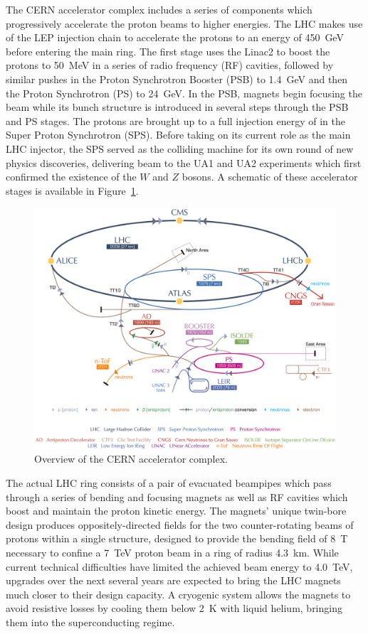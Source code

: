 The CERN accelerator complex includes a series of components which progressively accelerate the proton beams to higher energies.
The LHC makes use of the LEP injection chain to accelerate the protons to an energy of \SI{450}{\GeV} before entering the main ring.  
The first stage uses the Linac2 to boost the protons to \SI{50}{\MeV} in a series of radio frequency (RF) cavities, followed by similar pushes in the Proton Synchrotron Booster (PSB) to \SI{1.4}{\GeV} and then the Proton Synchrotron (PS) to \SI{24}{\GeV}.  In the PSB, magnets begin focusing the beam while its bunch structure is introduced in several steps through the PSB and PS stages.  The protons are brought up to a full injection energy of  in the Super Proton Synchrotron (SPS).  Before taking on its current role as the main LHC injector, the SPS served as the colliding machine for its own round of new physics discoveries, delivering beam to the UA1 and UA2 experiments which first confirmed the existence of the $W$ and $Z$ bosons.  A schematic of these accelerator stages is available in Figure~\ref{fig:lhc-complex}.

\begin{figure}
  \centering
  \includegraphics[width=\textwidth]{figures/cern-accelerator-complex-detail.png}
  \caption{Overview of the CERN accelerator complex.}
  \label{fig:lhc-complex}
\end{figure}

The actual LHC ring consists of a pair of evacuated beampipes which pass through a series of bending and focusing magnets as well as RF cavities which boost and maintain the proton kinetic energy.  The magnets' unique twin-bore design produces oppositely-directed fields for the two counter-rotating beams of protons within a single structure, designed to provide the bending field of \SI{8}{T} necessary to confine a \SI{7}{TeV} proton beam in a ring of radius \SI{4.3}{km}.  While current technical difficulties have limited the achieved beam energy to \SI{4.0}{\TeV}, upgrades over the next several years are expected to bring the LHC magnets much closer to their design capacity.  A cryogenic system allows the magnets to avoid resistive losses by cooling them below \SI{2}{K} with liquid helium, bringing them into the superconducting regime.

